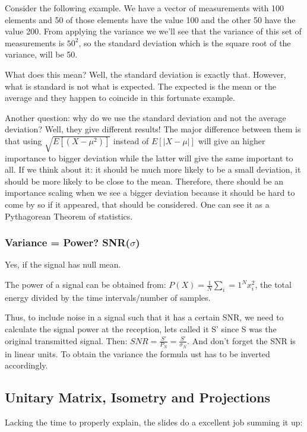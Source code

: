 \documentclass[12pt, a4paper]{article}
\begin{document}
\par Consider the following example. We have a vector of measurements with 100 elements and 50 of those elements have the value 100 and the other 50 have the value 200.
From applying the variance we we'll see that the variance of this set of measurements is $50^2$, so the standard deviation which is the square root of the variance, will be 50. 
\par What does this mean? Well, the standard deviation is exactly that. However, what is standard is not what is expected. The expected is the mean or the average and they happen to coincide in this fortunate example.
\par Another question: why do we use the standard deviation and not the average deviation? Well, they give different results! The major difference between them is that using $\sqrt{E[(X-\mu^2)]}$ instead of $E[|X-\mu|]$ will give an higher importance to bigger deviation while the latter will give the same important to all. If we think about it: it should be much more likely to be a small deviation, it should be more likely to be close to the mean. Therefore, there should be an importance scaling when we see a bigger deviation because it should be hard to come by so if it appeared, that should be considered. One can see it as a Pythagorean Theorem of statistics.

\subsubsection{Variance = Power? SNR($\sigma$)}
Yes, if the signal has null mean.

The power of a signal can be obtained from: $P(X) = \frac{1}{N}\sum_i=1^Nx_i^2$, the total energy divided by the time intervals/number of samples.

Thus, to include noise in a signal such that it has a certain SNR, we need to calculate the signal power at the reception, lets called it S' since S was the original transmitted signal. Then: $SNR = \frac{S'}{P_N} = \frac{S'}{\sigma_N}$. And don't forget the SNR is in linear units. To obtain the variance the formula ust has to be inverted accordingly.

\subsection{Unitary Matrix, Isometry and Projections}
\par Lacking the time to properly explain, the slides do a excellent job summing it up:
\end{document}
